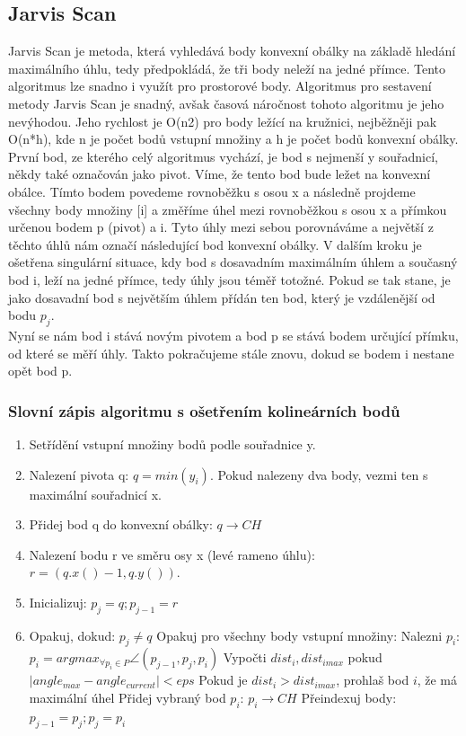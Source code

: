 \documentclass[a4paper,11pt,twoside]{article}
\begin{document}
\subsection{Jarvis Scan}
\large
Jarvis Scan je metoda, která vyhledává body konvexní obálky na základě hledání maximálního úhlu, tedy předpokládá, že tři body neleží na jedné přímce. Tento algoritmus lze snadno i využít pro prostorové body. Algoritmus pro sestavení metody Jarvis Scan je snadný, avšak časová náročnost tohoto algoritmu je jeho nevýhodou. Jeho rychlost je O(n2) pro body ležící na kružnici, nejběžněji pak O(n*h), kde n je počet bodů vstupní množiny a h je počet bodů konvexní obálky. \\
\indent První bod, ze kterého celý algoritmus vychází, je bod s nejmenší y souřadnicí, někdy také označován jako pivot. Víme, že tento bod bude ležet na konvexní obálce. Tímto bodem povedeme rovnoběžku s osou x a následně projdeme všechny body množiny [i] a změříme úhel mezi rovnoběžkou s osou x a přímkou určenou bodem p (pivot) a i. Tyto úhly mezi sebou porovnáváme a největší z těchto úhlů nám označí následující bod konvexní obálky. V dalším kroku je ošetřena singulární situace, kdy bod s dosavadním maximálním úhlem a současný bod i, leží na jedné přímce, tedy úhly jsou téměř totožné. Pokud se tak stane, je jako dosavadní bod s největším úhlem přídán ten bod, který je vzdálenější od bodu $p_j$. \\
\indent Nyní se nám bod i stává novým pivotem a bod p se stává bodem určující přímku, od které se měří úhly. Takto pokračujeme stále znovu, dokud se bodem i nestane opět bod p.

\newpage
\vspace*{-1cm}
\subsubsection{Slovní zápis algoritmu s ošetřením kolineárních bodů}
\begin{enumerate}
\item Setřídění vstupní množiny bodů podle souřadnice y.
\item Nalezení pivota q:  $ q = min(y_i) $. Pokud nalezeny dva body, vezmi ten s maximální souřadnicí x.
\item Přidej bod q do konvexní obálky:  $ q \rightarrow CH  $ 
\item Nalezení bodu r ve směru osy x (levé rameno úhlu): $ r = (q.x()-1, q.y()) $.
\item Inicializuj: $p_j = q; p_{j-1} = r$
\item Opakuj, dokud: $ p_j \ne q $
\subitem Opakuj pro všechny body vstupní množiny:
\subsubitem Nalezni $p_i$: $ p_i= arg  max_{\forall p_i \in P}  \angle (p_{j-1}, p_j, p_i)$ 
\subsubitem Vypočti  $ dist_i, dist_{imax}$ pokud $ |angle_{max} - angle_{current}| < eps $ 
\subsubitem Pokud je $ dist_i > dist_{imax}$, prohlaš bod $i$, že má maximální úhel
\subitem Přidej vybraný bod $p_i$: $ p_i \rightarrow CH  $
\subitem Přeindexuj body: $ p_{j-1} = p_j; p_j = p_i  $
\end{enumerate}
\end{document}
